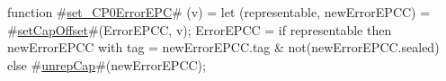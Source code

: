 function #\hyperref[sailMIPSzsetzyCP0ErrorEPC]{set\_CP0ErrorEPC}# (v) = {
  let (representable, newErrorEPCC) = #\hyperref[sailMIPSzsetCapOffset]{setCapOffset}#(ErrorEPCC, v);
  ErrorEPCC = if representable then
      {newErrorEPCC with tag = newErrorEPCC.tag & not(newErrorEPCC.sealed)}
    else
      #\hyperref[sailMIPSzunrepCap]{unrepCap}#(newErrorEPCC);
}
